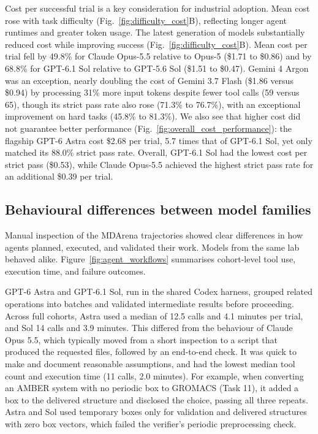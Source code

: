 Cost per successful trial is a key consideration for industrial adoption. Mean cost rose with task difficulty (Fig.~\ref{fig:difficulty_cost}B), reflecting longer agent runtimes and greater token usage. The latest generation of models substantially reduced cost while improving success (Fig.~\ref{fig:difficulty_cost}B). Mean cost per trial fell by 49.8\% for Claude Opus-5.5 relative to Opus-5 (\$1.71 to \$0.86) and by 68.8\% for GPT-6.1 Sol relative to GPT-5.6 Sol (\$1.51 to \$0.47). Gemini 4 Argon was an exception, nearly doubling the cost of Gemini 3.7 Flash (\$1.86 versus \$0.94) by processing 31\% more input tokens despite fewer tool calls (59 versus 65), though its strict pass rate also rose (71.3\% to 76.7\%), with an exceptional improvement on hard tasks (45.8\% to 81.3\%). We also see that higher cost did not guarantee better performance (Fig.~\ref{fig:overall_cost_performance}): the flagship GPT-6 Astra cost \$2.68 per trial, 5.7 times that of GPT-6.1 Sol, yet only matched its 88.0\% strict pass rate. Overall, GPT-6.1 Sol had the lowest cost per strict pass (\$0.53), while Claude Opus-5.5 achieved the highest strict pass rate for an additional \$0.39 per trial.


\subsection{Behavioural differences between model families}

Manual inspection of the MDArena trajectories showed clear differences in how agents planned, executed, and validated their work. Models from the same lab behaved alike. Figure~\ref{fig:agent_workflows} summarises cohort-level tool use, execution time, and failure outcomes.

GPT-6 Astra and GPT-6.1 Sol, run in the shared Codex harness, grouped related operations into batches and validated intermediate results before proceeding. Across full cohorts, Astra used a median of 12.5 calls and 4.1 minutes per trial, and Sol 14 calls and 3.9 minutes. This differed from the behaviour of Claude Opus 5.5, which typically moved from a short inspection to a script that produced the requested files, followed by an end-to-end check. It was quick to make and document reasonable assumptions, and had the lowest median tool count and execution time (11 calls, 2.0 minutes). For example, when converting an AMBER system with no periodic box to GROMACS (Task 11), it added a box to the delivered structure and disclosed the choice, passing all three repeats. Astra and Sol used temporary boxes only for validation and delivered structures with zero box vectors, which failed the verifier’s periodic preprocessing check. 

